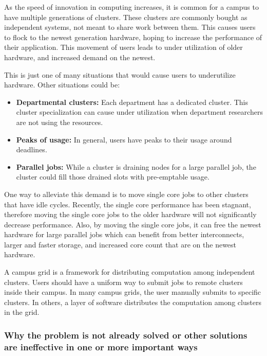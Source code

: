 \documentclass[11pt]{article}
\begin{document}
As the speed of innovation in computing increases, it is common for a campus to have multiple generations of clusters.  These clusters are commonly bought as independent systems, not meant to share work between them.  This causes users to flock to the newest generation hardware, hoping to increase the performance of their application.  This movement of users leads to under utilization of older hardware, and increased demand on the newest.

This is just one of many situations that would cause users to underutilize hardware.  Other situations could be:

\begin{itemize}
\item \textbf{Departmental clusters:}  Each department has a dedicated cluster.  This cluster specialization can cause under utilization when department researchers are not using the resources.
\item \textbf{Peaks of usage:} In general, users have peaks to their usage around deadlines.
\item \textbf{Parallel jobs:} While a cluster is draining nodes for a large parallel job, the cluster could fill those drained slots with pre-emptable usage.
\end{itemize}

One way to alleviate this demand is to move single core jobs to other clusters that have idle cycles.  Recently, the single core performance has been stagnant, therefore moving the single core jobs to the older hardware will not significantly decrease performance.  Also, by moving the single core jobs, it can free the newest hardware for large parallel jobs which can benefit from better interconnects, larger and faster storage, and increased core count that are on the newest hardware.

A campus grid is a framework for distributing computation among independent clusters.  Users should have a uniform way to submit jobs to remote clusters inside their campus.  In many campus grids, the user manually submits to specific clusters.  In others, a layer of software distributes the computation among clusters in the grid. 



\subsubsection* {Why the problem is not already solved or other solutions 
are ineffective in one or more important ways}
\end{document}
